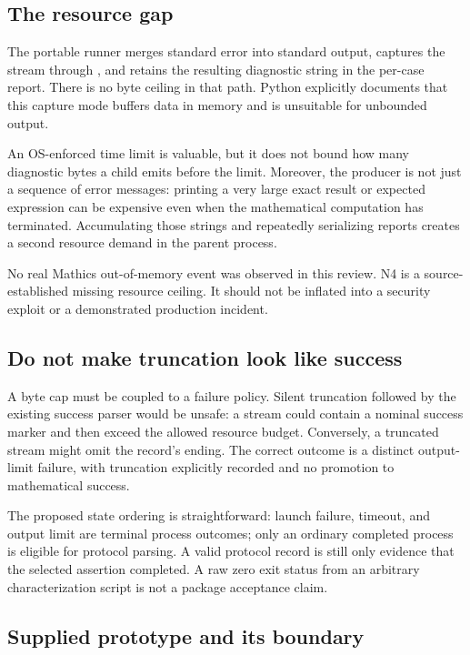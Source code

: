 \documentclass[11pt,letterpaper]{article}
\newcommand{\code}[1]{\texttt{\detokenize{#1}}}
\begin{document}
\subsection{The resource gap}

The portable runner merges standard error into standard output, captures the stream through \code{communicate}, and retains the resulting diagnostic string in the per-case report. There is no byte ceiling in that path. Python explicitly documents that this capture mode buffers data in memory and is unsuitable for unbounded output.~\cite{runner,pysubprocess}

An OS-enforced time limit is valuable, but it does not bound how many diagnostic bytes a child emits before the limit. Moreover, the producer is not just a sequence of error messages: printing a very large exact result or expected expression can be expensive even when the mathematical computation has terminated. Accumulating those strings and repeatedly serializing reports creates a second resource demand in the parent process.

No real Mathics out-of-memory event was observed in this review. N4 is a source-established missing resource ceiling. It should not be inflated into a security exploit or a demonstrated production incident.

\subsection{Do not make truncation look like success}

A byte cap must be coupled to a failure policy. Silent truncation followed by the existing success parser would be unsafe: a stream could contain a nominal success marker and then exceed the allowed resource budget. Conversely, a truncated stream might omit the record's ending. The correct outcome is a distinct output-limit failure, with truncation explicitly recorded and no promotion to mathematical success.

The proposed state ordering is straightforward: launch failure, timeout, and output limit are terminal process outcomes; only an ordinary completed process is eligible for protocol parsing. A valid protocol record is still only evidence that the selected assertion completed. A raw zero exit status from an arbitrary characterization script is not a package acceptance claim.

\subsection{Supplied prototype and its boundary}
\end{document}
